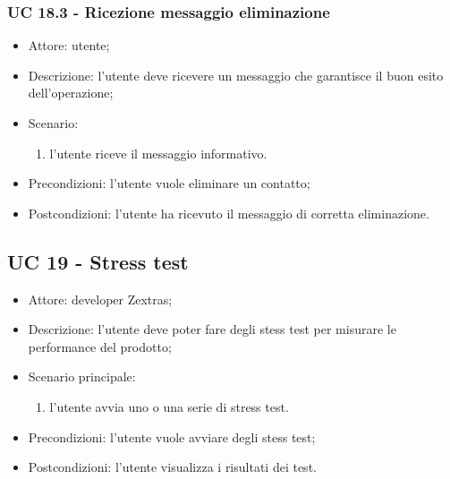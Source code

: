 \subsubsection{UC 18.3 - Ricezione messaggio eliminazione} \label{sec: UC 18.3}
\begin{itemize}
    \item Attore: utente;
    \item Descrizione: l'utente deve ricevere un messaggio che garantisce il buon esito dell'operazione;
    \item Scenario:
        \begin{enumerate}
        \item l'utente riceve il messaggio informativo.
        \end{enumerate}
    
    \item Precondizioni: l'utente vuole eliminare un contatto;
    \item Postcondizioni: l'utente ha ricevuto il messaggio di corretta eliminazione.
\end{itemize}


\subsection{UC 19 - Stress test}
\begin{itemize}
    \item Attore: developer Zextras;
    \item Descrizione: l'utente deve poter fare degli stess test per misurare le performance del prodotto;
    \item Scenario principale:
        \begin{enumerate}
        \item l'utente avvia uno o una serie di stress test. 
        \end{enumerate}
    \item Precondizioni: l'utente vuole avviare degli stess test;
    \item Postcondizioni: l'utente visualizza i risultati dei test.
\end{itemize}